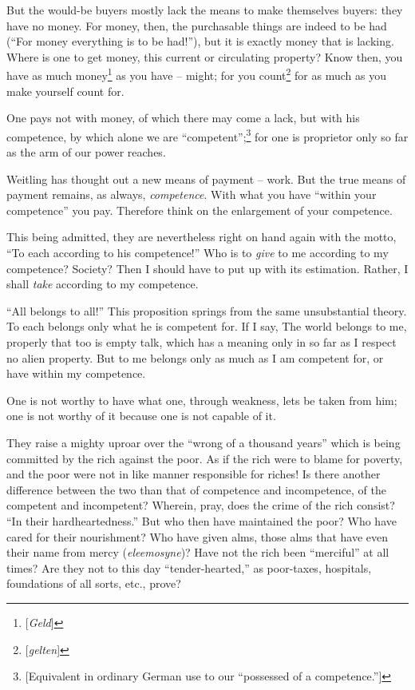 But the would-be buyers mostly lack the means to make themselves buyers: they 
have no money. For money, then, the purchasable things are indeed to be had 
(``For money everything is to be had!''), but it is exactly money that is 
lacking. Where is one to get money, this current or circulating property? Know 
then, you have as much money\footnote{[\textit{Geld}]} as you have -- might; 
for you count\footnote{[\textit{gelten}]} for as much as you make yourself 
count for.

One pays not with money, of which there may come a lack, but with his 
competence, by which alone we are ``competent'';\footnote{[Equivalent in 
ordinary German use to our ``possessed of a competence.'']} for one is 
proprietor only so far as the arm of our power reaches.

Weitling has thought out a new means of payment -- work. But the true means of 
payment remains, as always, \textit{competence}. With what you have ``within 
your competence'' you pay. Therefore think on the enlargement of your 
competence.

This being admitted, they are nevertheless right on hand again with the motto, 
``To each according to his competence!'' Who is to \textit{give} to me 
according to my competence? Society? Then I should have to put up with its 
estimation. Rather, I shall \textit{take} according to my competence.

``All belongs to all!'' This proposition springs from the same unsubstantial 
theory. To each belongs only what he is competent for. If I say, The world 
belongs to me, properly that too is empty talk, which has a meaning only in so 
far as I respect no alien property. But to me belongs only as much as I am 
competent for, or have within my competence.

One is not worthy to have what one, through weakness, lets be taken from him; 
one is not worthy of it because one is not capable of it.

They raise a mighty uproar over the ``wrong of a thousand years'' which is 
being committed by the rich against the poor. As if the rich were to blame for 
poverty, and the poor were not in like manner responsible for riches! Is there 
another difference between the two than that of competence and incompetence, 
of the competent and incompetent? Wherein, pray, does the crime of the rich 
consist? ``In their hardheartedness.'' But who then have maintained the 
poor? Who have cared for their nourishment? Who have given alms, those alms 
that have even their name from mercy (\textit{eleemosyne})? Have not the rich 
been ``merciful'' at all times? Are they not to this day 
``tender-hearted,'' as poor-taxes, hospitals, foundations of all sorts, 
etc., prove?


